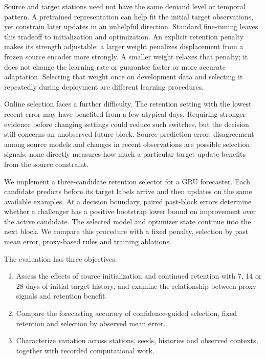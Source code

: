 \documentclass[pdflatex,iicol,sn-mathphys-num]{sn-jnl}
\begin{document}
Source and target stations need not have the same demand level or temporal pattern. A pretrained representation can help fit the initial target observations, yet constrain later updates in an unhelpful direction. Standard fine-tuning leaves this tradeoff to initialization and optimization. An explicit retention penalty makes its strength adjustable: a larger weight penalizes displacement from a frozen source encoder more strongly. A smaller weight relaxes that penalty; it does not change the learning rate or guarantee faster or more accurate adaptation. Selecting that weight once on development data and selecting it repeatedly during deployment are different learning procedures.

Online selection faces a further difficulty. The retention setting with the lowest recent error may have benefited from a few atypical days. Requiring stronger evidence before changing settings could reduce such switches, but the decision still concerns an unobserved future block. Source prediction error, disagreement among source models and changes in recent observations are possible selection signals; none directly measures how much a particular target update benefits from the source constraint.

We implement a three-candidate retention selector for a GRU forecaster. Each candidate predicts before its target labels arrive and then updates on the same available examples. At a decision boundary, paired past-block errors determine whether a challenger has a positive bootstrap lower bound on improvement over the active candidate. The selected model and optimizer state continue into the next block. We compare this procedure with a fixed penalty, selection by past mean error, proxy-based rules and training ablations.

The evaluation has three objectives:
\begin{enumerate}
\item Assess the effects of source initialization and continued retention with 7, 14 or 28 days of initial target history, and examine the relationship between proxy signals and retention benefit.
\item Compare the forecasting accuracy of confidence-guided selection, fixed retention and selection by observed mean error.
\item Characterize variation across stations, seeds, histories and observed contexts, together with recorded computational work.
\end{enumerate}
\end{document}

